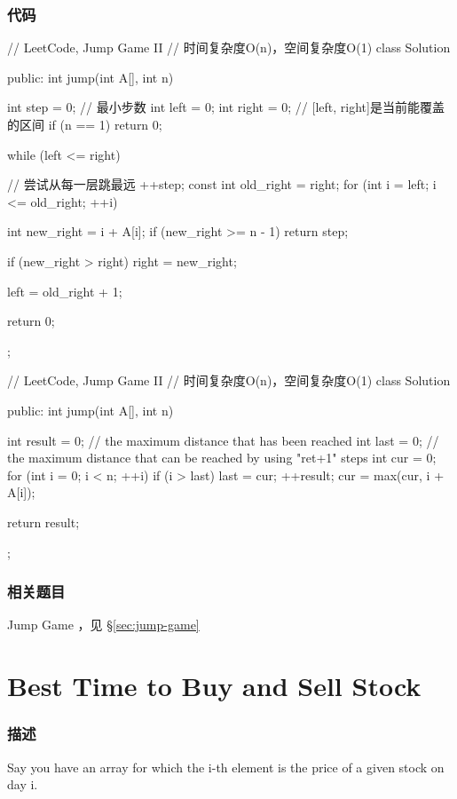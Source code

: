 \subsubsection{代码}
\begin{Code}
// LeetCode, Jump Game II
// 时间复杂度O(n)，空间复杂度O(1)
class Solution {
public:
    int jump(int A[], int n) {
        int step = 0; // 最小步数
        int left = 0;
        int right = 0;  // [left, right]是当前能覆盖的区间
        if (n == 1) return 0;

        while (left <= right) { // 尝试从每一层跳最远
            ++step;
            const int old_right = right;
            for (int i = left; i <= old_right; ++i) {
                int new_right = i + A[i];
                if (new_right >= n - 1) return step;

                if (new_right > right) right = new_right;
            }
            left = old_right + 1;
        }
        return 0;
    }
};
\end{Code}

\begin{Code}
// LeetCode, Jump Game II
// 时间复杂度O(n)，空间复杂度O(1)
class Solution {
public:
    int jump(int A[], int n) {
        int result = 0;
        // the maximum distance that has been reached
        int last = 0;
        // the maximum distance that can be reached by using "ret+1" steps
        int cur = 0;
        for (int i = 0; i < n; ++i) {
            if (i > last) {
                last = cur;
                ++result;
            }
            cur = max(cur, i + A[i]);
        }

        return result;
    }
};
\end{Code}


\subsubsection{相关题目}
\begindot
\item Jump Game ，见 \S \ref{sec:jump-game}
\myenddot


\section{Best Time to Buy and Sell Stock} %
\label{sec:best-time-to-buy-and-sell-stock}


\subsubsection{描述}
Say you have an array for which the i-th element is the price of a given stock on day i.

